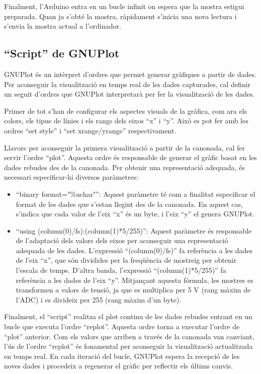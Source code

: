 \documentclass{tfgitic}[2023/06/30]
\begin{document}
Finalment, l'Arduino entra en un bucle infinit on espera que la mostra
estigui preparada. Quan ja s'obté la mostra, ràpidament s'inicia una
nova lectura i s'envia la mostra actual a l'ordinador.

\subsection{``Script'' de GNUPlot}

GNUPlot és un intèrpret d'ordres que permet generar gràfiques a partir
de dades. Per aconseguir la visualització en temps real de les dades
capturades, cal definir un seguit d'ordres que GNUPlot interpretarà
per fer la visualització de les dades.

Primer de tot s'han de configurar els aspectes visuals de la gràfica,
com ara els colors, els tipus de línies i els rangs dels eixos ``x'' i
``y''. Això es pot fer amb les ordres ``set style'' i ``set
xrange/yrange'' respectivament.

Llavors per aconseguir la primera visualització a partir de la
canonada, cal fer servir l'ordre ``plot''. Aquesta ordre és
responsable de generar el gràfic basat en les dades rebudes des de la
canonada. Per obtenir una representació adequada, és necessari
especificar-hi diversos paràmetres:

\begin{itemize}
	\item ``binary format="\%uchar"'': Aquest paràmetre té com a
          finalitat especificar el format de les dades que s'estan
          llegint des de la canonada. En aquest cas, s'indica que cada
          valor de l'eix ``x'' és un byte, i l'eix ``y'' el genera
          GNUPlot.
	\item ``using (column(0)/fs):(column(1)*5/255)'': Aquest
          paràmetre és responsable de l'adaptació dels valors dels
          eixos per aconseguir una representació adequada de les
          dades. L'expressió ``(column(0)/fs)'' fa referència a les
          dades de l'eix ``x'', que són dividides per la freqüència de
          mostreig per obtenir l'escala de temps. D'altra banda,
          l'expressió ``(column(1)*5/255)'' fa referència a les dades
          de l'eix ``y''. Mitjançant aquesta fórmula, les mostres es
          transformen a valors de tensió, ja que es multiplica per 5 V
          (rang màxim de l'ADC) i es divideix per 255 (rang màxim d'un
          byte).
\end{itemize}

Finalment, el ``script'' realitza el plot continu de les dades rebudes
entrant en un bucle que executa l'ordre ``replot''. Aquesta ordre
torna a executar l'ordre de ``plot'' anterior. Com els valors que
arriben a través de la canonada van canviant, l'ús de l'ordre
``replot'' és fonamental per aconseguir la visualització actualitzada
en temps real. En cada iteració del bucle, GNUPlot espera la recepció
de les noves dades i procedeix a regenerar el gràfic per reflectir els
últims canvis.
\end{document}
